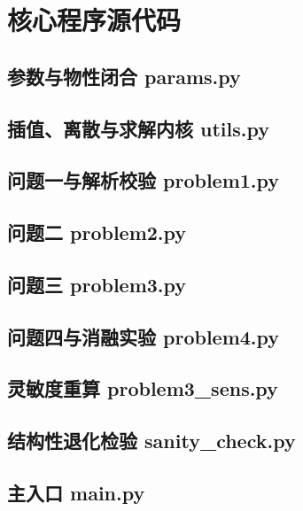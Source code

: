 \section{核心程序源代码}


\subsection{参数与物性闭合 params.py}


\subsection{插值、离散与求解内核 utils.py}


\subsection{问题一与解析校验 problem1.py}


\subsection{问题二 problem2.py}


\subsection{问题三 problem3.py}


\subsection{问题四与消融实验 problem4.py}


\subsection{灵敏度重算 problem3\_sens.py}


\subsection{结构性退化检验 sanity\_check.py}


\subsection{主入口 main.py}

